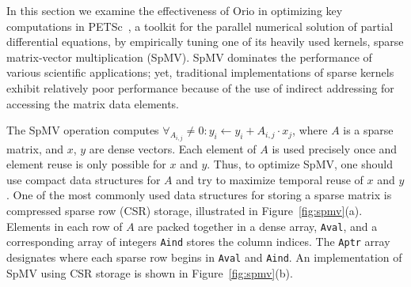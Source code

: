 In this section we examine the effectiveness of Orio in optimizing key
computations in PETSc~\cite{petsc-user-ref}, a toolkit for the parallel
numerical solution of partial differential equations, by empirically tuning
one of its heavily used kernels, sparse matrix-vector multiplication
(SpMV). SpMV dominates the performance of various scientific applications;
yet, traditional implementations of sparse kernels exhibit relatively poor
performance because of the use of indirect addressing for accessing the
matrix data elements.

The SpMV operation computes $\forall_{A_{i,j}} \neq 0:y_{i}
\leftarrow y_{i} + A_{i,j} \cdot x_{j}$, where $A$ is a sparse matrix,
and $x$, $y$ are dense vectors. Each element of $A$ is used precisely once
and element reuse is only possible for $x$ and $y$. Thus, to optimize SpMV,
one should use compact data structures for $A$ and try to maximize temporal
reuse of $x$ and $y$. One of the most commonly used data structures for
storing a sparse matrix is compressed sparse row (CSR) storage,
illustrated in Figure~\ref{fig:spmv}(a). Elements in each row of $A$ are
packed together in a dense array, \texttt{Aval}, and a corresponding array of
integers \texttt{Aind} stores the column indices. The \texttt{Aptr} array
designates where each sparse row begins in \texttt{Aval} and
\texttt{Aind}. An implementation of SpMV using CSR storage is
shown in Figure~\ref{fig:spmv}(b).

